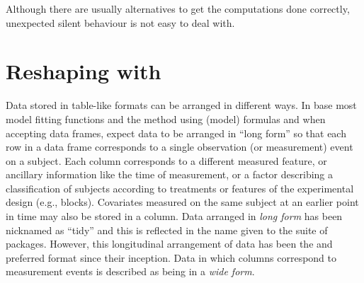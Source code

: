\documentclass[krantz2]{krantz}\usepackage{knitr}
\begin{document}
\begin{warningbox}
\begin{knitrout}\footnotesize
{}\color{fgcolor}
\end{knitrout}

Although there are usually alternatives to get the computations done correctly, unexpected silent behaviour is not easy to deal with.
\end{warningbox}


\section{Reshaping with }
Data stored in table-like formats can be arranged in different ways. In base \Rlang most model fitting functions and the  method using (model) formulas and when accepting data frames, expect data to be arranged in ``long form'' so that each row in a data frame corresponds to a single observation (or measurement) event on a subject. Each column corresponds to a different measured feature, or ancillary information like the time of measurement, or a factor describing a classification of subjects according to treatments or features of the experimental design (e.g., blocks). Covariates measured on the same subject at an earlier point in time may also be stored in a column. Data arranged in \emph{long form} has been nicknamed as ``tidy'' and this is reflected in the name given to the  suite of packages. However, this longitudinal arrangement of data has been the \Rlang and \Slang preferred format since their inception. Data in which columns correspond to measurement events is described as being in a \emph{wide form}.
\end{document}
